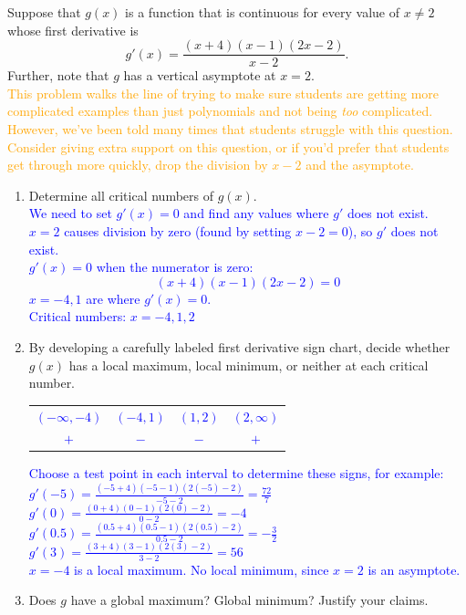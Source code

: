 \documentclass{ximera}
\begin{document}
\begin{exercise}
    Suppose that $g(x)$ is a function that is continuous for every value of $x\neq 2$ whose first derivative is 
    $$g'(x)=\frac{(x+4)(x-1)(2x-2)}{x-2}.$$
    Further, note that $g$ has a vertical asymptote at $x=2$. \\
    \textcolor{orange}{This problem walks the line of trying to make sure students are getting more complicated examples than just polynomials and not being \textit{too} complicated.  However, we've been told many times that students struggle with this question.  Consider giving extra support on this question, or if you'd prefer that students get through more quickly, drop the division by $x-2$ and the asymptote.}
    \begin{enumerate}
        \item Determine all critical numbers of $g(x)$.\\
        \textcolor{blue}{We need to set $g'(x)=0$ and find any values where $g'$ does not exist. \\
        $x=2$ causes division by zero (found by setting $x-2=0$), so $g'$ does not exist.\\
        $g'(x)=0$ when the numerator is zero: 
        \[(x+4)(x-1)(2x-2)=0\]
        $x=-4, 1$ are where $g'(x)=0$.\\
        Critical numbers: $x=-4,1,2$}
        \item By developing a carefully labeled first derivative sign chart, decide whether $g(x)$ has a local maximum, local minimum, or neither at each critical number.\\
        \textcolor{blue}{
          \begin{tabular}{c|c|c|c}
            $(-\infty,-4)$ & $(-4,1)$ & $(1,2)$ & $(2,\infty)$\\
            $+$ & $-$ & $-$ & $+$
          \end{tabular}
          Choose a test point in each interval to determine these signs, for example:\\
          $g'(-5)=\frac{(-5+4)(-5-1)(2(-5)-2)}{-5-2}=\frac{72}{7}$\\
          $g'(0)=\frac{(0+4)(0-1)(2(0)-2)}{0-2}=-4$\\
          $g'(0.5)=\frac{(0.5+4)(0.5-1)(2(0.5)-2)}{0.5-2}=-\frac32$\\
          $g'(3)=\frac{(3+4)(3-1)(2(3)-2)}{3-2}=56$\\
          $x=-4$ is a local maximum.  No local minimum, since $x=2$ is an asymptote.
        }
        \item Does $g$ have a global maximum?  Global minimum?  Justify your claims.\\

\end{enumerate}
\end{exercise}
\end{document}
